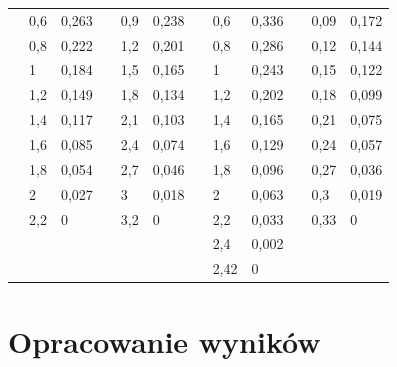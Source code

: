 \documentclass{fizykalab}
\begin{document}
\begin{table}[H]
\begin{tabular}{|l|l|l|l|l|l|l|l|l|l|l|l|}
 & 0,6 & 0,263 &  & 0,9 & 0,238 &  & 0,6  & 0,336 &  & 0,09 & 0,172 \\ \cline{2-3} \cline{5-6} \cline{8-9} \cline{11-12} 
 & 0,8 & 0,222 &  & 1,2 & 0,201 &  & 0,8  & 0,286 &  & 0,12 & 0,144 \\ \cline{2-3} \cline{5-6} \cline{8-9} \cline{11-12} 
 & 1   & 0,184 &  & 1,5 & 0,165 &  & 1    & 0,243 &  & 0,15 & 0,122 \\ \cline{2-3} \cline{5-6} \cline{8-9} \cline{11-12} 
 & 1,2 & 0,149 &  & 1,8 & 0,134 &  & 1,2  & 0,202 &  & 0,18 & 0,099 \\ \cline{2-3} \cline{5-6} \cline{8-9} \cline{11-12} 
 & 1,4 & 0,117 &  & 2,1 & 0,103 &  & 1,4  & 0,165 &  & 0,21 & 0,075 \\ \cline{2-3} \cline{5-6} \cline{8-9} \cline{11-12} 
 & 1,6 & 0,085 &  & 2,4 & 0,074 &  & 1,6  & 0,129 &  & 0,24 & 0,057 \\ \cline{2-3} \cline{5-6} \cline{8-9} \cline{11-12} 
 & 1,8 & 0,054 &  & 2,7 & 0,046 &  & 1,8  & 0,096 &  & 0,27 & 0,036 \\ \cline{2-3} \cline{5-6} \cline{8-9} \cline{11-12} 
 & 2   & 0,027 &  & 3   & 0,018 &  & 2    & 0,063 &  & 0,3  & 0,019 \\ \cline{2-3} \cline{5-6} \cline{8-9} \cline{11-12} 
 & 2,2 & 0     &  & 3,2 & 0     &  & 2,2  & 0,033 &  & 0,33 & 0     \\ \cline{2-3} \cline{5-6} \cline{8-9} \cline{11-12} 
 &     &       &  &     &       &  & 2,4  & 0,002 &  &      &       \\ \cline{2-3} \cline{5-6} \cline{8-9} \cline{11-12} 
 &     &       &  &     &       &  & 2,42 & 0     &  &      &       \\ \hline
\end{tabular}
\end{table}

\section{Opracowanie wyników}
\end{document}
